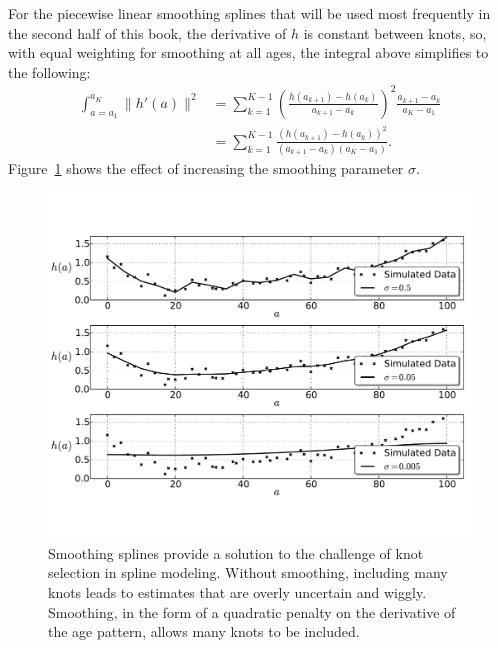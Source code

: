 For the piecewise linear smoothing splines that will be used most
frequently in the second half of this book, the derivative of $h$ is
constant between knots, so, with equal weighting for smoothing at all
ages, the integral above simplifies to the following:
\begin{align*}
\int _{a=a_1} ^{a_K} \| h'(a) \|^2
& = \sum_{k=1} ^{K-1} \left(\frac{h(a_{k+1}) - h(a_k)}{a_{k+1}-a_k}\right)^2 \frac{a_{k+1}-a_k}{a_K - a_1}\\
&= \sum_{k=1} ^{K-1} \frac{\left(h(a_{k+1}) - h(a_k)\right)^2}{(a_{k+1}-a_k)(a_K - a_1)}.
\end{align*}
Figure~\ref{smoothing-splines} shows the effect of increasing the
smoothing parameter $\sigma$.

\begin{figure}[h]
\begin{center}
\includegraphics[width=\textwidth]{smoothing-splines.pdf}
\caption{Smoothing splines provide a solution to the challenge of knot
  selection in spline modeling.  Without smoothing, including many
  knots leads to estimates that are overly uncertain and wiggly.
  Smoothing, in the form of a quadratic penalty on the derivative of
  the age pattern, allows many knots to be included.}
\label{smoothing-splines}
\end{center}
\end{figure}


